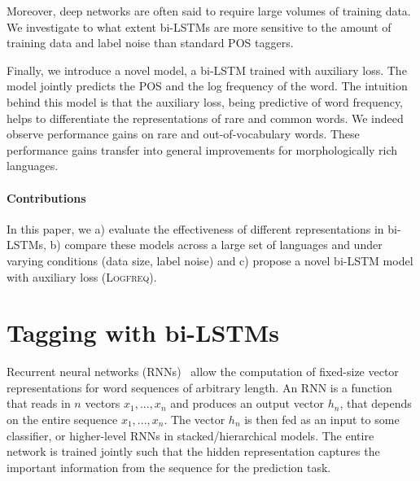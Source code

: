 \documentclass[11pt]{article}
\begin{document}
Moreover, deep networks are often said to require large volumes of training data. We investigate to what extent bi-LSTMs are more sensitive to the amount of training data and label noise than 
standard POS taggers.

Finally, we introduce a novel model, a bi-LSTM trained with auxiliary loss. The model jointly predicts the POS and the log frequency of 
the word. The intuition behind this model is that the auxiliary loss, being predictive of word frequency, helps to differentiate the representations of rare and common words.
We indeed observe performance gains on rare and out-of-vocabulary words. These performance gains transfer into general improvements for morphologically rich languages. 

\paragraph{Contributions} In this paper, we a) evaluate the effectiveness of different representations in bi-LSTMs, 
b) compare these models across a large set of languages and under varying conditions (data size, label noise) and
c) propose a novel bi-LSTM model with auxiliary loss (\textsc{Logfreq}). 


\section{Tagging with bi-LSTMs}

Recurrent neural networks (RNNs)~\cite{elman:1990} allow the computation of fixed-size vector representations for word sequences of arbitrary length.  
An RNN is a function that reads in $n$ vectors $x_1,...,x_n$ and produces an output vector $h_n$, that depends on the entire sequence $x_1,...,x_n$. 
The vector $h_n$ is then fed as an input to some classifier, or higher-level RNNs in stacked/hierarchical models.
The entire network is trained jointly such that the hidden representation captures the important information from the sequence for the prediction task.
\end{document}
